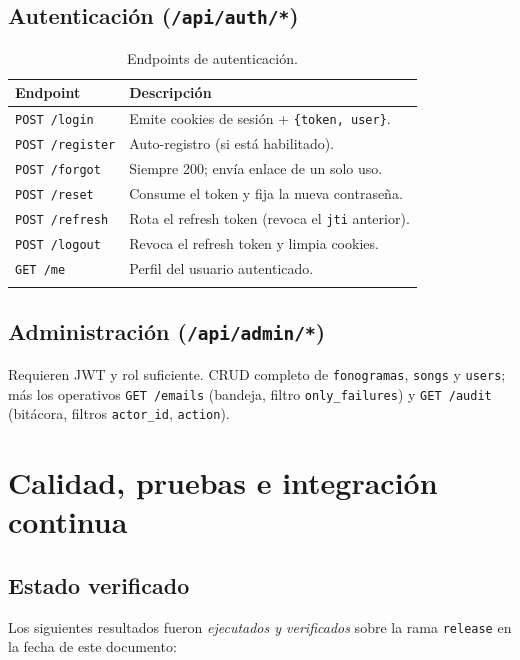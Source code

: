 \documentclass[11pt,letterpaper,twoside]{report}
\newcommand{\codigo}[1]{\texttt{#1}}
\begin{document}
\section{Autenticación (\texttt{/api/auth/*})}
\begin{longtable}{p{4.6cm}p{9.8cm}}
  \toprule
  \textbf{Endpoint} & \textbf{Descripción} \\
  \midrule
  \endhead
  \codigo{POST /login}    & Emite cookies de sesión + \codigo{\{token, user\}}. \\
  \codigo{POST /register} & Auto-registro (si está habilitado). \\
  \codigo{POST /forgot}   & Siempre 200; envía enlace de un solo uso. \\
  \codigo{POST /reset}    & Consume el token y fija la nueva contraseña. \\
  \codigo{POST /refresh}  & Rota el refresh token (revoca el \codigo{jti} anterior). \\
  \codigo{POST /logout}   & Revoca el refresh token y limpia cookies. \\
  \codigo{GET /me}        & Perfil del usuario autenticado. \\
  \bottomrule
  \caption{Endpoints de autenticación.}
  \label{tab:api-auth}
\end{longtable}

\section{Administración (\texttt{/api/admin/*})}
Requieren JWT y rol suficiente. CRUD completo de \codigo{fonogramas},
\codigo{songs} y \codigo{users}; más los operativos
\codigo{GET /emails} (bandeja, filtro \codigo{only_failures}) y
\codigo{GET /audit} (bitácora, filtros \codigo{actor_id},
\codigo{action}).

\chapter{Calidad, pruebas e integración continua}
\label{cap:calidad}

\section{Estado verificado}
Los siguientes resultados fueron \emph{ejecutados y verificados} sobre
la rama \codigo{release} en la fecha de este documento:
\end{document}

